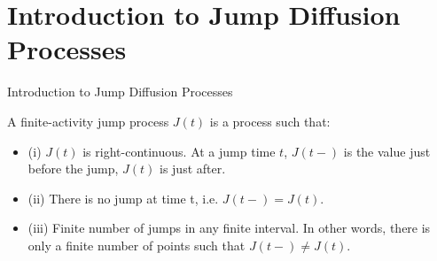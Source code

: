 \documentclass{beamer}
\begin{document}
\section{Introduction to Jump Diffusion Processes}
\begin{frame}{Introduction to Jump Diffusion Processes}

    {\footnotesize \footnotesize
    \par A finite-activity jump process $J(t)$ is a process such that:
    \begin{itemize}
        \item (i) \( J(t) \) is right-continuous. 
        At a jump time \( t \), \( J(t-) \) is the value just before the jump, \( J(t) \) is just after.
        \item (ii) There is no jump at time t, i.e. \( J(t-) = J(t) \).
        \item (iii) Finite number of jumps in any finite interval. In other words, there is only a finite number of points such that \( J(t-) \neq J(t) \).
    \end{itemize}
    }
\end{frame}



    
\end{document}
